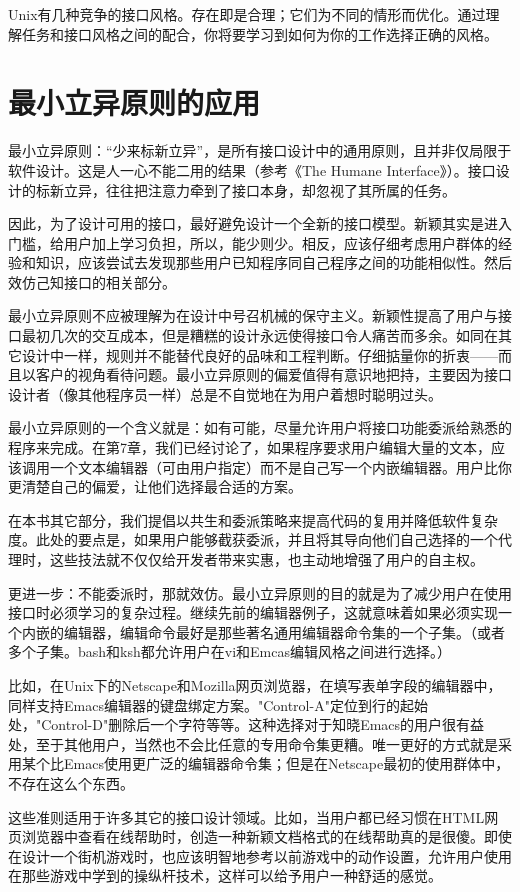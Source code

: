 \documentclass[12pt,oneside]{book}
\begin{document}
\begin{common-format}
Unix有几种竞争的接口风格。存在即是合理；它们为不同的情形而优化。通过理解任务和接口风格之间的配合，你将要学习到如何为你的工作选择正确的风格。

\section{最小立异原则的应用}
最小立异原则：“少来标新立异”，是所有接口设计中的通用原则，且并非仅局限于软件设计。这是人一心不能二用的结果（参考《The Humane Interface》\cite{Raskin}）。接口设计的标新立异，往往把注意力牵到了接口本身，却忽视了其所属的任务。

因此，为了设计可用的接口，最好避免设计一个全新的接口模型。新颖其实是进入门槛，给用户加上学习负担，所以，能少则少。相反，应该仔细考虑用户群体的经验和知识，应该尝试去发现那些用户已知程序同自己程序之间的功能相似性。然后效仿己知接口的相关部分。

最小立异原则不应被理解为在设计中号召机械的保守主义。新颖性提高了用户与接口最初几次的交互成本，但是糟糕的设计永远使得接口令人痛苦而多余。如同在其它设计中一样，规则并不能替代良好的品味和工程判断。仔细掂量你的折衷——而且以客户的视角看待问题。最小立异原则的偏爱值得有意识地把持，主要因为接口设计者（像其他程序员一样）总是不自觉地在为用户着想时聪明过头。

最小立异原则的一个含义就是：如有可能，尽量允许用户将接口功能委派给熟悉的程序来完成。在第7章，我们已经讨论了，如果程序要求用户编辑大量的文本，应该调用一个文本编辑器（可由用户指定）而不是自己写一个内嵌编辑器。用户比你更清楚自己的偏爱，让他们选择最合适的方案。

在本书其它部分，我们提倡以共生和委派策略来提高代码的复用并降低软件复杂度。此处的要点是，如果用户能够截获委派，并且将其导向他们自己选择的一个代理时，这些技法就不仅仅给开发者带来实惠，也主动地增强了用户的自主权。

更进一步：不能委派时，那就效仿。最小立异原则的目的就是为了减少用户在使用接口时必须学习的复杂过程。继续先前的编辑器例子，这就意味着如果必须实现一个内嵌的编辑器，编辑命令最好是那些著名通用编辑器命令集的一个子集。（或者多个子集。bash和ksh都允许用户在vi和Emcas编辑风格之间进行选择。）

比如，在Unix下的Netscape和Mozilla网页浏览器，在填写表单字段的编辑器中，同样支持Emacs编辑器的键盘绑定方案。"Control-A"定位到行的起始处，"Control-D"删除后一个字符等等。这种选择对于知晓Emacs的用户很有益处，至于其他用户，当然也不会比任意的专用命令集更糟。唯一更好的方式就是采用某个比Emacs使用更广泛的编辑器命令集；但是在Netscape最初的使用群体中，不存在这么个东西。

这些准则适用于许多其它的接口设计领域。比如，当用户都已经习惯在HTML网页浏览器中查看在线帮助时，创造一种新颖文档格式的在线帮助真的是很傻。即使在设计一个街机游戏时，也应该明智地参考以前游戏中的动作设置，允许用户使用在那些游戏中学到的操纵杆技术，这样可以给予用户一种舒适的感觉。



\end{common-format}
\end{document}
